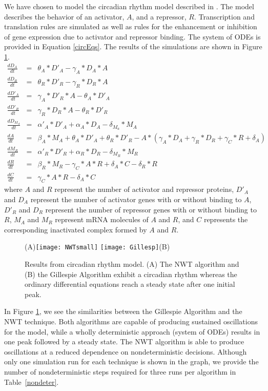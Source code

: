 \documentclass[copyright]{eptcs}
\newcommand{\noi}{\noindent}
\begin{document}
We have chosen to model the circadian rhythm model described in \cite{vilar02}.  The model describes the behavior of an activator, $A$, and a repressor, $R$.  Transcription and translation rules are simulated as well as rules for the enhancement or inhibition of gene expression due to activator and repressor binding.  The system of ODEs is provided in Equation \ref{circEqs}.  The results of the simulations are shown in Figure \ref{circrhythm}.
\begin{eqnarray}
\frac{dD_A}{dt}&=&\theta_A*D'_A-\gamma_A*D_A*A\nonumber\\
\frac{dD_R}{dt}&=&\theta_R*D'_R-\gamma_R*D_R*A\nonumber\\
\frac{dD'_A}{dt}&=&\gamma_A*D'_R*A-\theta_A*D'_A\nonumber\\
\frac{dD'_R}{dt}&=&\gamma_R*D_R*A-\theta_R*D'_R\nonumber\\
\frac{dD_{M_A}}{dt}&=&\alpha'_A*D'_A+\alpha_A*D_A-\delta_{M_a}*M_A\nonumber\\
\frac{dA}{dt}&=&\beta_A*M_A+\theta_A*D'_A+\theta_R*D'_R-A*(\gamma_A*D_A+\gamma_R*D_R+\gamma_C*R+\delta_A)\nonumber\\
\frac{dM_R}{dt}&=&\alpha'_R*D'_R+\alpha_R*D_R-\delta_{M_R}*M_R\nonumber\\
\frac{dR}{dt}&=&\beta_R*M_R-\gamma_C*A*R+\delta_A*C-\delta_R*R\nonumber\\
\frac{dC}{dt}&=&\gamma_C*A*R-\delta_A*C
\label{circEqs}
\end{eqnarray}
\noi where $A$ and $R$ represent the number of activator and repressor proteins, $D'_A$ and $D_A$ represent the number of activator genes with or without binding to $A$, $D'_R$ and $D_R$ represent the number of repressor genes with or without binding to $R$, $M_A$ and $M_R$ represent mRNA molecules of $A$ and $R$, and $C$ represents the corresponding inactivated complex formed by $A$ and $R$.

\begin{figure}[ht]
\centering
(A)\texttt{[image: NWTsmall]}
\texttt{[image: Gillesp]}(B)
\caption{Results from circadian rhythm model.  (A) The NWT algorithm and (B) the Gillespie Algorithm exhibit a circadian rhythm whereas the ordinary differential equations reach a steady state after one initial peak.}
\label{circrhythm}
\end{figure}

In Figure \ref{circrhythm}, we see the similarities between the Gillespie Algorithm and the NWT technique.  Both algorithms are capable of producing sustained oscillations for the model, while a wholly deterministic approach (system of ODEs) results in one peak followed by a steady state.  The NWT algorithm is able to produce oscillations at a reduced dependence on nondeterministic decisions.  Although only one simulation run for each technique is shown in the graph, we provide the number of nondeterministic steps required for three runs per algorithm in Table~\ref{nondeter}.
\vspace{-1mm}
\end{document}
